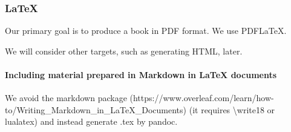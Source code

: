 \hypertarget{latex}{%
\subsubsection{LaTeX}\label{latex}}

Our primary goal is to produce a book in PDF format. We use PDFLaTeX.

We will consider other targets, such as generating HTML, later.

\hypertarget{including-material-prepared-in-markdown-in-latex-documents}{%
\paragraph{Including material prepared in Markdown in LaTeX
documents}\label{including-material-prepared-in-markdown-in-latex-documents}}

We avoid the markdown package
(https://www.overleaf.com/learn/how-to/Writing\_Markdown\_in\_LaTeX\_Documents)
(it requires \textbackslash{}write18 or lualatex) and instead generate
.tex by pandoc.

